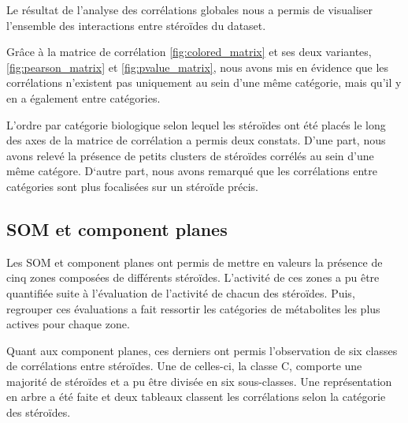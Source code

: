 
	Le résultat de l'analyse des corrélations globales nous a permis de visualiser l'ensemble des interactions entre stéroïdes du dataset.

	Grâce à la matrice de corrélation \autoref{fig:colored_matrix} et ses deux variantes, \autoref{fig:pearson_matrix} et \autoref{fig:pvalue_matrix}, nous avons mis en évidence que les corrélations n'existent pas uniquement au sein d'une même catégorie, mais qu'il y en a également entre catégories. 


	L'ordre par catégorie biologique selon lequel les stéroïdes ont été placés le long des axes de la matrice de corrélation a permis deux constats. D'une part, nous avons relevé la présence de petits clusters de stéroïdes corrélés au sein d'une même catégore. D`autre part, nous avons remarqué que les corrélations entre catégories sont plus focalisées sur un stéroïde précis.

\subsection{SOM et component planes}
	
	

	Les SOM et component planes ont permis de mettre en valeurs la présence de cinq zones composées de différents stéroïdes. L'activité de ces zones a pu être quantifiée suite à l'évaluation de l'activité de chacun des stéroïdes. Puis, regrouper ces évaluations a fait ressortir les catégories de métabolites les plus actives pour chaque zone.


	Quant aux component planes, ces derniers ont permis l'observation de six classes de corrélations entre stéroïdes. Une de celles-ci, la classe C, comporte une majorité de stéroïdes et a pu être divisée en six sous-classes. Une représentation en arbre a été faite et deux tableaux classent les corrélations selon la catégorie des stéroïdes.


